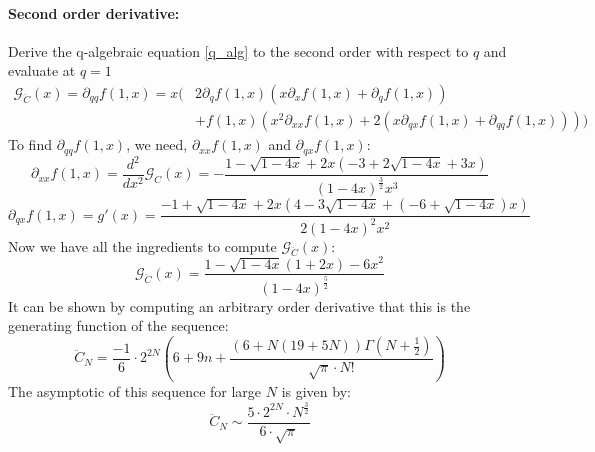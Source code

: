 \documentclass[pdflatex,sn-mathphys-num]{sn-jnl}
\theoremstyle{definition}
\theoremstyle{remark}
\numberwithin{equation}{section}
\begin{document}
\begin{appendices}
\noindent
\paragraph*{Second order derivative:}
Derive the q-algebraic equation \ref{q_alg} to the second order with respect to $q$ and evaluate at $q=1$
\begin{equation}
\begin{split}
\mathcal{G}_{\ddot{C}}(x) = \partial_{qq} f(1,x) = x \Big( & 2 \partial_q f(1,x) \left(x \partial_x f(1,x) + \partial_q f(1,x)\right) \\
& + f(1,x) \left(x^2 \partial_{xx} f(1,x) + 2 \left(x \partial_{qx} f(1,x) + \partial_{qq} f(1,x)\right)\right) \Big)
\end{split}
\end{equation}
To find $\partial_{qq}f(1,x)$, we need, $\partial_{xx} f(1,x)$ and $\partial_{qx} f(1,x)$:
\begin{equation}
    \partial_{xx} f(1,x) = \frac{d^2 }{dx^2} \mathcal{G}_{C}(x) = -\frac{{1 - \sqrt{1 - 4x} + 2x \left(-3 + 2\sqrt{1 - 4x} + 3x\right)}}{{\left(1 - 4x\right)^{\frac{3}{2}}x^3}}
\end{equation}
\begin{equation}
\partial_{qx} f(1,x) = g'(x) = \frac{-1 + \sqrt{1 - 4x} + 2x\left(4 - 3\sqrt{1 - 4x} + (-6 + \sqrt{1 - 4x})x\right)}{2(1 - 4x)^2 x^2}
\end{equation}
Now we have all the ingredients to compute $\mathcal{G}_{\ddot{C}}(x)$:
\begin{equation}
   \mathcal{G}_{\ddot{C}}(x) = \frac{1 - \sqrt{1 - 4x} (1+2x) - 6 x^2}{(1 - 4x)^{\frac{5}{2}}} 
\end{equation}
It can be shown by computing an arbitrary order derivative that this is the generating function of the sequence:
\begin{equation}
    \ddot{C}_N = \frac{-1}{6} \cdot 2^{2N} \left( 6 + 9n + \frac{\left(6 + N(19 + 5N)\right) \Gamma\left(N + \frac{1}{2}\right)}{\sqrt{\pi} \cdot N!} \right)
\end{equation}
The asymptotic of this sequence for large $N$ is given by:
\begin{equation}
    \ddot{C}_N \sim \frac{5 \cdot 2^{2N} \cdot N^{\frac{3}{2}}}{6 \cdot \sqrt{\pi}}
\end{equation}

\end{appendices}



\end{document}
